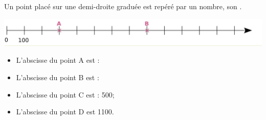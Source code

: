 

\begin{myprop}
	Un point placé sur une demi-droite graduée est repéré par un nombre, son .
\end{myprop}

\begin{myex}
	\begin{center}
		\includegraphics[scale=0.5]{img/axe}
	\end{center}

	\begin{itemize}
		\item L'abscisse du point A est :
		\item L'abscisse du point B est :
		\item L'abscisse du point C est : 500;
		\item L'abscisse du point D est \num{1100}.
	\end{itemize}
\end{myex}